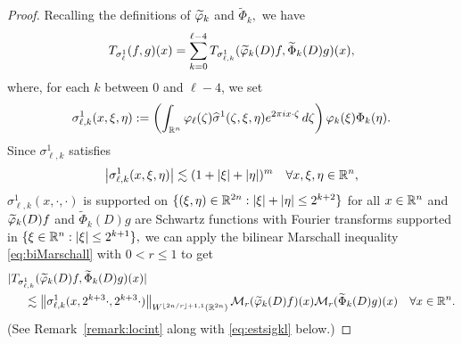 \begin{proof}
Recalling the definitions of $\widetilde{\varphi}_k$ and $\widetilde{\Phi}_k,$  we have
\begin{align*}
T_{\sigma^1_\ell}(f,g)(x) = 
  \sum\limits_{k=0}^{\ell -4} T_{\sigma^1_{\ell,k}}(\widetilde{\varphi}_k(D)f,\widetilde{\Phi}_k(D)g)(x),
\end{align*}
where, for each $k$ between $0$ and $\ell -4$, we set 
$$
\sigma^1_{\ell, k}(x, \xi, \eta):=\left( \int_{{{\mathbb R}^n}}  \varphi_\ell(\zeta) \widehat{\sigma}^1(\zeta, \xi, \eta) e^{2\pi i x \cdot \zeta}  \, d\zeta \right)  \varphi_k(\xi) \Phi_k(\eta).
$$ 
Since $\sigma^1_{\ell,k}$ satisfies 
$$\left\vert \sigma^1_{\ell,k}(x,\xi,\eta) \right\vert\lesssim (1+\left\vert \xi \right\vert+\left\vert \eta \right\vert)^m\quad \forall x,\xi,\eta\in{{\mathbb R}^n},$$
$\sigma^1_{\ell, k}(x,\cdot,\cdot)$ is supported on $\{(\xi, \eta) \in \mathbb{R}^{2n} : |\xi| + |\eta| \leq 2^{k+2}\}$ for all $x\in{{\mathbb R}^n}$ and $\widetilde{\varphi}_k(D)f$ and $\widetilde{\Phi}_k(D)g$ are Schwartz functions with  Fourier transforms  supported in $\{\xi \in {{\mathbb R}^n}: |\xi| \le 2^{k+1}\},$  we can apply the bilinear Marschall inequality \eqref{eq:biMarschall} with $0<r\le 1$ to get 
\begin{align}\label{eq:bound:h1:ell:k}
&|T_{\sigma^1_{\ell,k}}(\widetilde{\varphi}_k(D)f,\widetilde{\Phi}_k(D)g)(x)| \\
&\hspace{0.5cm}\lesssim  \left\|\sigma^1_{\ell, k}(x, 2^{k+3} \cdot, 2^{k+3} \cdot)\right\|_{W^{\lfloor{2n/r}\rfloor + 1,1}(\mathbb{R}^{2n})} \mathcal{M}_r(\widetilde{\varphi}_k(D)f)(x)\mathcal{M}_r(
\widetilde{\Phi}_k(D)g)(x)\quad \forall x\in{{\mathbb R}^n}.\nonumber
\end{align}
(See Remark~\ref{remark:locint} along with \eqref{eq:estsigkl} below.)


\end{proof}
